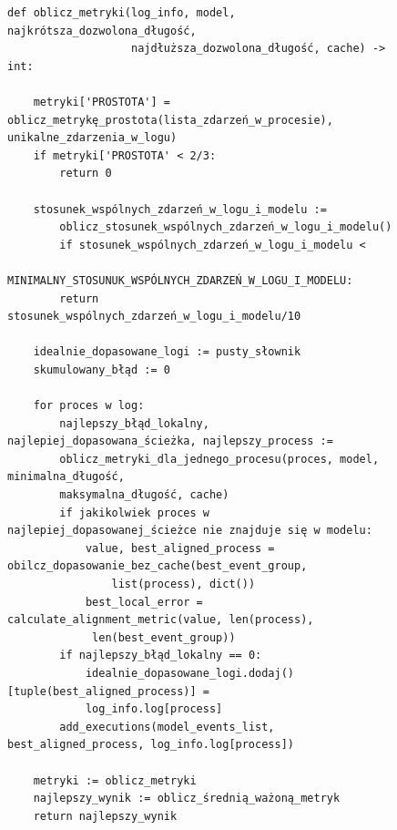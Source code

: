\clearpage
\begin{figure}[!ht]
\lstset{caption=Obliczanie metryk, captionpos=b}
\lstset{label=src:best_result, frame=single}
\begin{lstlisting}
def oblicz_metryki(log_info, model, najkrótsza_dozwolona_długość, 
                   najdłuższa_dozwolona_długość, cache) -> int:
                   
    metryki['PROSTOTA'] = oblicz_metrykę_prostota(lista_zdarzeń_w_procesie), unikalne_zdarzenia_w_logu)
    if metryki['PROSTOTA' < 2/3:
        return 0

    stosunek_wspólnych_zdarzeń_w_logu_i_modelu := 
        oblicz_stosunek_wspólnych_zdarzeń_w_logu_i_modelu()		   
        if stosunek_wspólnych_zdarzeń_w_logu_i_modelu <
            MINIMALNY_STOSUNUK_WSPÓLNYCH_ZDARZEŃ_W_LOGU_I_MODELU:
        return stosunek_wspólnych_zdarzeń_w_logu_i_modelu/10
        
    idealnie_dopasowane_logi := pusty_słownik
    skumulowany_błąd := 0
    
    for proces w log:
        najlepszy_błąd_lokalny, najlepiej_dopasowana_ścieżka, najlepszy_process := 
      	oblicz_metryki_dla_jednego_procesu(proces, model, minimalna_długość, 
      	maksymalna_długość, cache)
    	if jakikolwiek proces w najlepiej_dopasowanej_ścieżce nie znajduje się w modelu:
            value, best_aligned_process = obilcz_dopasowanie_bez_cache(best_event_group, 
                list(process), dict())
            best_local_error = calculate_alignment_metric(value, len(process),
             len(best_event_group))
        if najlepszy_błąd_lokalny == 0:
            idealnie_dopasowane_logi.dodaj()[tuple(best_aligned_process)] = 
            log_info.log[process]
        add_executions(model_events_list, best_aligned_process, log_info.log[process])

	metryki := oblicz_metryki 
	najlepszy_wynik := oblicz_średnią_ważoną_metryk
    return najlepszy_wynik
\end{lstlisting}
\end{figure}

